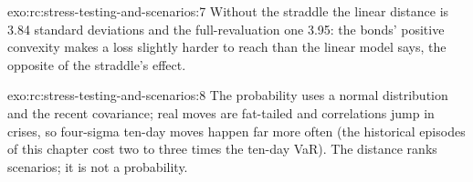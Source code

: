 \begin{solution}{exo:rc:stress-testing-and-scenarios:7}
Without the straddle the linear distance is 3.84 standard deviations and the full-revaluation one
3.95: the bonds' positive convexity makes a loss slightly harder to reach than the linear model says,
the opposite of the straddle's effect.
\end{solution}

\begin{solution}{exo:rc:stress-testing-and-scenarios:8}
The probability uses a normal distribution and the recent covariance; real moves are fat-tailed and
correlations jump in crises, so four-sigma ten-day moves happen far more often (the historical
episodes of this chapter cost two to three times the ten-day VaR). The distance ranks scenarios; it
is not a probability.
\end{solution}

